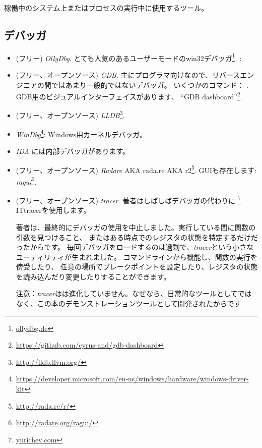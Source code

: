 
稼働中のシステム上またはプロセスの実行中に使用するツール。

\subsection{デバッガ}

\myindex{\olly}

\begin{itemize}
\item (フリー) \emph{OllyDbg}.
とても人気のあるユーザーモードのwin32デバッガ\footnote{\href{http://go.yurichev.com/17032}{ollydbg.de}}.
\ShortHotKeyCheatsheet: 

\item (フリー、オープンソース) \emph{GDB}.
主にプログラマ向けなので、リバースエンジニアの間ではあまり一般的ではないデバッガ。
いくつかのコマンド： .
GDB用のビジュアルインターフェイスがあります、 ``GDB dashboard''\footnote{\url{https://github.com/cyrus-and/gdb-dashboard}}.

\item (フリー、オープンソース) \emph{LLDB}\footnote{\url{http://lldb.llvm.org/}}.

\item \emph{WinDbg}\footnote{\url{https://developer.microsoft.com/en-us/windows/hardware/windows-driver-kit}}:
Windows用カーネルデバッガ。

\item \emph{IDA} には内部デバッガがあります。

\item (フリー、オープンソース) \emph{Radare} \ac{AKA} rada.re \ac{AKA} r2\footnote{\url{http://rada.re/r/}}.
GUIも存在します: \emph{ragui}\footnote{\url{http://radare.org/ragui/}}.

\item (フリー、オープンソース) \emph{tracer}.
\label{tracer}
著者はしばしばデバッガの代わりに
\footnote{\href{http://go.yurichev.com/17338}{yurichev.com}}
IT{tracer}を使用します。

著者は、最終的にデバッガの使用を中止しました。実行している間に関数の引数を見つけること、
またはある時点でのレジスタの状態を特定するだけだったからです。
毎回デバッガをロードするのは過剰で、\emph{tracer}という小さなユーティリティが生まれました。
コマンドラインから機能し、関数の実行を傍受したり、
任意の場所でブレークポイントを設定したり、レジスタの状態を読み込んだり変更したりすることができます。

注意：\emph{tracer}はは進化していません。なぜなら、日常的なツールとしてではなく、この本のデモンストレーションツールとして開発されたからです
\end{itemize}

